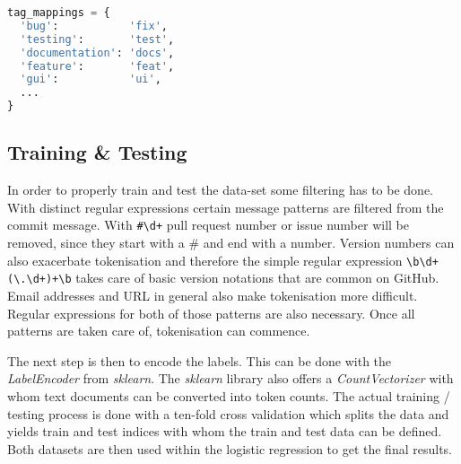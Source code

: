 \begin{lstlisting}[language=python, label={lst:tag_map}, caption={Dictionary for conventional tag mappings}]
tag_mappings = {
  'bug':           'fix',
  'testing':       'test',
  'documentation': 'docs',
  'feature':       'feat',
  'gui':           'ui',
  ...
}
\end{lstlisting}

\subsection{Training \& Testing}

In order to properly train and test the data-set some filtering has to be done.
With distinct regular expressions certain message patterns are filtered from
the commit message. With \lstinline{#\d+} pull request number or issue number
will be removed, since they start with a \# and end with a number. Version
numbers can also exacerbate tokenisation and therefore the simple regular
expression \lstinline{\b\d+(\.\d+)+\b} takes care of basic version notations
that are common on GitHub. Email addresses and URL in general also make
tokenisation more difficult. Regular expressions for both of those patterns are
also necessary. Once all patterns are taken care of, tokenisation can commence.

The next step is then to encode the labels. This can be done  with the
\textit{LabelEncoder} from \textit{sklearn}. The \textit{sklearn} library also
offers a \textit{CountVectorizer} with whom text documents can be converted
into token counts. The actual training / testing process is done with a
ten-fold cross validation which splits the data and yields train and test
indices with whom the train and test data can be defined. Both datasets are
then used within the logistic regression to get the final results.
